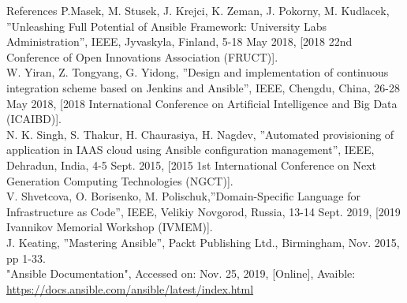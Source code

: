 \documentclass[10pt]{beamer}
\begin{document}
{\1
\begin{frame}{References}
\fontsize{7}{9}\ttfamily
P.Masek, M. Stusek, J. Krejci, K. Zeman, J. Pokorny, M. Kudlacek, ''Unleashing Full Potential of Ansible Framework: University Labs Administration'', IEEE, Jyvaskyla, Finland, 5-18 May 2018, [2018 22nd Conference of Open Innovations Association (FRUCT)].\\
W. Yiran, Z. Tongyang, G. Yidong, ''Design and implementation of continuous integration scheme based on Jenkins and Ansible'', IEEE, Chengdu, China, 26-28 May 2018, [2018 International Conference on Artificial Intelligence and Big Data (ICAIBD)].\\
N. K. Singh, S. Thakur, H. Chaurasiya, H. Nagdev, ''Automated provisioning of application in IAAS cloud using Ansible configuration management'', IEEE, Dehradun, India, 4-5 Sept. 2015, [2015 1st International Conference on Next Generation Computing Technologies (NGCT)].\\
V. Shvetcova, O. Borisenko, M. Polischuk,''Domain-Specific Language for Infrastructure as Code'', IEEE, Velikiy Novgorod, Russia, 13-14 Sept. 2019, [2019 Ivannikov Memorial Workshop (IVMEM)].\\
J. Keating, ''Mastering Ansible'', Packt Publishing Ltd., Birmingham, Nov. 2015, pp 1-33.\\
"Ansible Documentation", Accessed on: Nov. 25, 2019, [Online], Avaible: \href{https://docs.ansible.com/ansible/latest/index.html}{https://docs.ansible.com/ansible/latest/index.html}

\end{frame}
}
 
\end{document}
